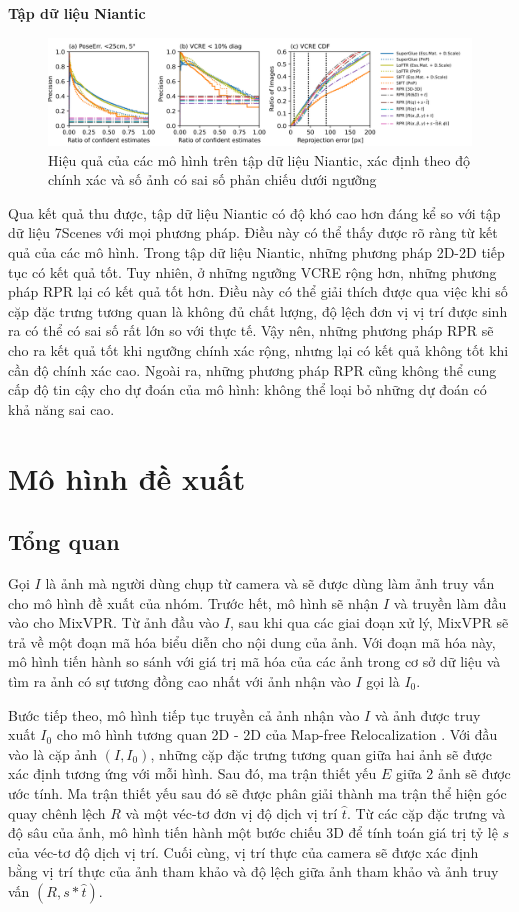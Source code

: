 \textbf{Tập dữ liệu Niantic \cite{arnold2022mapfree}}

\begin{figure}[H]
    \centering
    \includegraphics[scale=0.4]{pics/Proposal/all_niantic.png}
    \caption{Hiệu quả của các mô hình trên tập dữ liệu Niantic, xác định theo độ chính xác và số ảnh có sai số phản chiếu dưới ngưỡng}
\end{figure}

Qua kết quả thu được, tập dữ liệu Niantic có độ khó cao hơn đáng kể so với tập dữ liệu 7Scenes với mọi phương pháp. Điều này có thể thấy được rõ ràng từ kết quả của các mô hình. Trong tập dữ liệu Niantic, những phương pháp 2D-2D tiếp tục có kết quả tốt. Tuy nhiên, ở những ngưỡng VCRE rộng hơn, những phương pháp RPR lại có kết quả tốt hơn. Điều này có thể giải thích được qua việc khi số cặp đặc trưng tương quan là không đủ chất lượng, độ lệch đơn vị vị trí được sinh ra có thể có sai số rất lớn so với thực tế. Vậy nên, những phương pháp RPR sẽ cho ra kết quả tốt khi ngưỡng chính xác rộng, nhưng lại có kết quả không tốt khi cần độ chính xác cao. Ngoài ra, những phương pháp RPR cũng không thể cung cấp độ tin cậy cho dự đoán của mô hình: không thể loại bỏ những dự đoán có khả năng sai cao.

\section{Mô hình đề xuất}
\subsection{Tổng quan}
Gọi $I$ là ảnh mà người dùng chụp từ camera và sẽ được dùng làm ảnh truy vấn cho mô hình đề xuất của nhóm. Trước hết, mô hình sẽ nhận $I$ và truyền làm đầu vào cho MixVPR. Từ ảnh đầu vào $I$, sau khi qua các giai đoạn xử lý, MixVPR sẽ trả về một đoạn mã hóa biểu diễn cho nội dung của ảnh. Với đoạn mã hóa này, mô hình tiến hành so sánh với giá trị mã hóa của các ảnh trong cơ sở dữ liệu và tìm ra ảnh có sự tương đồng cao nhất với ảnh nhận vào $I$ gọi là $I_0$.

Bước tiếp theo, mô hình tiếp tục truyền cả ảnh nhận vào $I$ và ảnh được truy xuất $I_0$ cho mô hình tương quan 2D - 2D của Map-free Relocalization \cite{arnold2022mapfree}. Với đầu vào là cặp ảnh $(I, I_0)$, những cặp đặc trưng tương quan giữa hai ảnh sẽ được xác định tương ứng với mỗi hình. Sau đó, ma trận thiết yếu $E$ giữa 2 ảnh sẽ được ước tính. Ma trận thiết yếu sau đó sẽ được phân giải thành ma trận thể hiện góc quay chênh lệch $R$ và một véc-tơ đơn vị độ dịch vị trí $\hat{t}$. Từ các cặp đặc trưng và độ sâu của ảnh, mô hình tiến hành một bước chiếu 3D để tính toán giá trị tỷ lệ $s$ của véc-tơ độ dịch vị trí. Cuối cùng, vị trí thực của camera sẽ được xác định bằng vị trí thực của ảnh tham khảo và độ lệch giữa ảnh tham khảo và ảnh truy vấn $(R,s*\hat{t})$.

